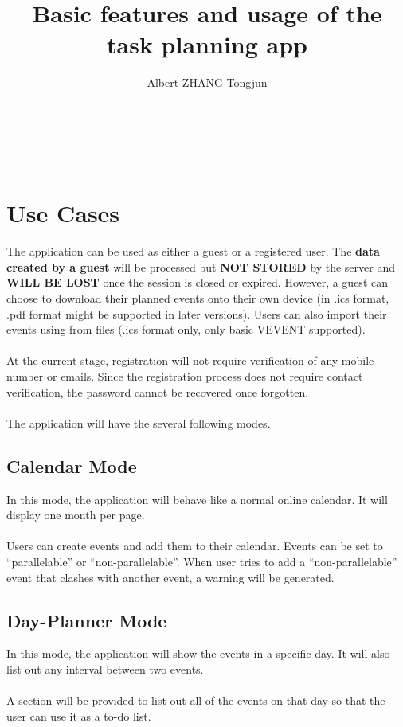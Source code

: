 \documentclass{article}[12pt]
\title{Basic features and usage of the task planning app}
\author{Albert ZHANG Tongjun}
\begin{document}
\maketitle
\tableofcontents
~\\~\\


\section{Use Cases}
The application can be used as either a guest or a registered user.
The \textbf{data created by a guest} will be processed but \textbf{NOT STORED} by the server and \textbf{WILL BE LOST} once the session is closed or expired.
However, a guest can choose to download their planned events onto their own device (in .ics format, .pdf format might be supported in later versions).
Users can also import their events using from files (.ics format only, only basic VEVENT supported).
~\\~\\
At the current stage, registration will not require verification of any mobile number or emails.
Since the registration process does not require contact verification, the password cannot be recovered once forgotten.
~\\~\\
The application will have the several following modes.
~\\

\subsection{Calendar Mode}
In this mode, the application will behave like a normal online calendar.
It will display one month per page.
~\\~\\
Users can create events and add them to their calendar.
Events can be set to ``parallelable'' or ``non-parallelable''.
When user tries to add a ``non-parallelable'' event that clashes with another event, a warning will be generated.
~\\

\subsection{Day-Planner Mode}
In this mode, the application will show the events in a specific day.
It will also list out any interval between two events.
~\\~\\
A section will be provided to list out all of the events on that day so that the user can use it as a to-do list.
~\\
\end{document}

